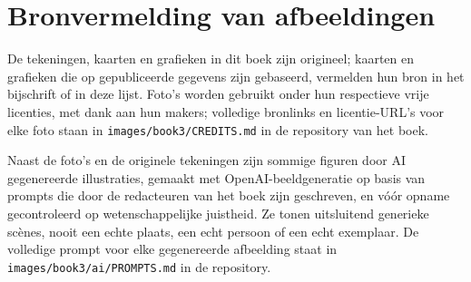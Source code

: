\chapter*{Bronvermelding van afbeeldingen}

De tekeningen, kaarten en grafieken in dit boek zijn origineel; kaarten en
grafieken die op gepubliceerde gegevens zijn gebaseerd, vermelden hun bron in
het bijschrift of in deze lijst. Foto's worden gebruikt onder hun respectieve
vrije licenties, met dank aan hun makers; volledige bronlinks en
licentie-URL's voor elke foto staan in \texttt{images/book3/CREDITS.md} in de
repository van het boek.

\bigskip
Naast de foto's en de originele tekeningen zijn sommige figuren door AI
gegenereerde illustraties, gemaakt met OpenAI-beeldgeneratie op basis van
prompts die door de redacteuren van het boek zijn geschreven, en vóór opname
gecontroleerd op wetenschappelijke juistheid. Ze tonen uitsluitend generieke
scènes, nooit een echte plaats, een echt persoon of een echt exemplaar. De
volledige prompt voor elke gegenereerde afbeelding staat in
\texttt{images/book3/ai/PROMPTS.md} in de repository.

